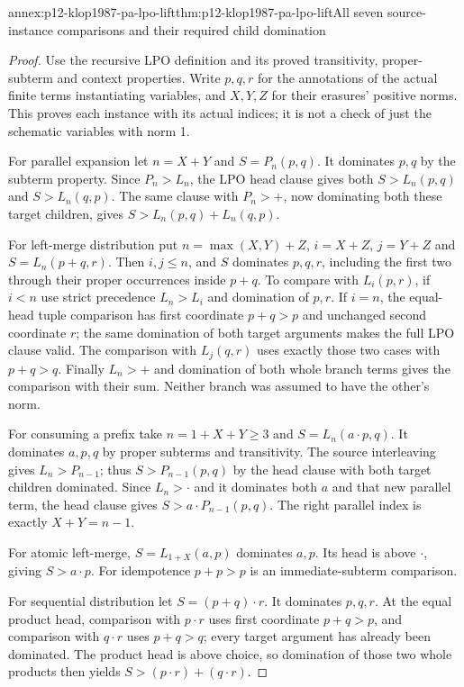 \begin{annexitem}{annex:p12-klop1987-pa-lpo-lift}{thm:p12-klop1987-pa-lpo-lift}{All seven source-instance comparisons and their required child domination}
\begin{proof}
Use the recursive LPO definition and its proved transitivity,
proper-subterm and context properties. Write \(p,q,r\) for
the annotations of the actual finite terms instantiating variables,
and \(X,Y,Z\) for their erasures' positive norms. This proves
each instance with its actual indices; it is not a check of just
the schematic variables with norm 1.

For parallel expansion let \(n=X+Y\) and
\(S=P_n(p,q)\). It dominates \(p,q\) by the subterm property.
Since \(P_n>L_n\), the LPO head clause gives both
\(S>L_n(p,q)\) and \(S>L_n(q,p)\). The same clause with
\(P_n>+\), now dominating both these target children, gives
\(S>L_n(p,q)+L_n(q,p)\).

For left-merge distribution put
\(n=\max(X,Y)+Z\), \(i=X+Z\), \(j=Y+Z\) and
\(S=L_n(p+q,r)\). Then \(i,j\leq n\), and \(S\)
dominates \(p,q,r\), including the first two through their
proper occurrences inside \(p+q\). To compare with \(L_i(p,r)\),
if \(i<n\) use strict precedence \(L_n>L_i\) and domination
of \(p,r\). If \(i=n\), the equal-head tuple comparison
has first coordinate \(p+q>p\) and unchanged second coordinate
\(r\); the same domination of both target arguments makes
the full LPO clause valid. The comparison with \(L_j(q,r)\)
uses exactly those two cases with \(p+q>q\). Finally
\(L_n>+\) and domination of both whole branch terms gives
the comparison with their sum. Neither branch was assumed to
have the other's norm.

For consuming a prefix take \(n=1+X+Y\geq3\) and
\(S=L_n(a\cdot p,q)\). It dominates \(a,p,q\) by proper
subterms and transitivity. The source interleaving gives
\(L_n>P_{n-1}\); thus \(S>P_{n-1}(p,q)\) by the head
clause with both target children dominated. Since \(L_n>\cdot\)
and it dominates both \(a\) and that new parallel term, the
head clause gives \(S>a\cdot P_{n-1}(p,q)\).
The right parallel index is exactly \(X+Y=n-1\).

For atomic left-merge, \(S=L_{1+X}(a,p)\) dominates \(a,p\).
Its head is above \(\cdot\), giving \(S>a\cdot p\).
For idempotence \(p+p>p\) is an immediate-subterm comparison.

For sequential distribution let \(S=(p+q)\cdot r\).
It dominates \(p,q,r\). At the equal product head, comparison
with \(p\cdot r\) uses first coordinate \(p+q>p\), and
comparison with \(q\cdot r\) uses \(p+q>q\); every target
argument has already been dominated. The product head is above
choice, so domination of those two whole products then yields
\(S>(p\cdot r)+(q\cdot r)\).


\end{proof}
\end{annexitem}
